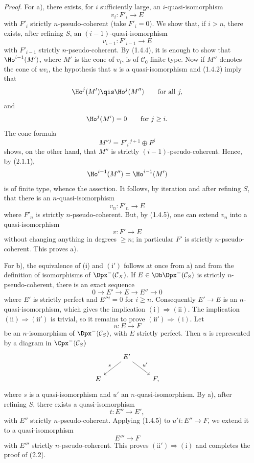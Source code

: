 \emph{Proof.} For a), there exists, for \(i\) sufficiently large, an \(i\)-quasi-isomorphism
\[
  v_i:F'_i\longrightarrow E
\]
with \(F'_i\) strictly \(n\)-pseudo-coherent (take \(F'_i=0\)). We show that, if \(i>n\), there exists, after refining \(S\), an \((i-1)\)-quasi-isomorphism
\[
  v_{i-1}:F'_{i-1}\longrightarrow E
\]
with \(F'_{i-1}\) strictly \(n\)-pseudo-coherent. By (1.4.4), it is enough to show that \(\Ho^{i-1}(M')\), where \(M'\) is the cone of \(v_i\), is of \(\mathcal C_0\)-finite type. Now if \(M''\) denotes the cone of \(uv_i\), the hypothesis that \(u\) is a quasi-isomorphism and (1.4.2) imply that
\[
  \Ho^j(M')\qis \Ho^j(M'')\qquad\text{for all }j,
\]
and
\[
  \Ho^j(M')=0\qquad\text{for }j\geq i.
\]
The cone formula
\[
  M''{}^j=F'_i{}^{\,j+1}\oplus F^j
\]
shows, on the other hand, that \(M''\) is strictly \((i-1)\)-pseudo-coherent. Hence, by (2.1.1),
\[
  \Ho^{i-1}(M'')=\Ho^{i-1}(M')
\]
is of finite type, whence the assertion. It follows, by iteration and after refining \(S\), that there is an \(n\)-quasi-isomorphism
\[
  v_n:F'_n\longrightarrow E
\]
where \(F'_n\) is strictly \(n\)-pseudo-coherent. But, by (1.4.5), one can extend \(v_n\) into a quasi-isomorphism
\[
  v:F'\longrightarrow E
\]
without changing anything in degrees \(\geq n\); in particular \(F'\) is strictly \(n\)-pseudo-coherent. This proves a).

For b), the equivalence of (i) and \((\mathrm{i}')\) follows at once from a) and from the definition of isomorphisms of \(\Dpx^-(\mathcal C_X)\). If \(E\in\Ob\Dpx^-(\mathcal C_S)\) is strictly \(n\)-pseudo-coherent, there is an exact sequence
\[
  0\longrightarrow E'\longrightarrow E\longrightarrow E''\longrightarrow 0
\]
where \(E'\) is strictly perfect and \(E''{}^i=0\) for \(i\geq n\). Consequently \(E'\to E\) is an \(n\)-quasi-isomorphism, which gives the implication \((\mathrm{i})\Rightarrow(\mathrm{ii})\). The implication \((\mathrm{ii})\Rightarrow(\mathrm{ii}')\) is trivial, so it remains to prove \((\mathrm{ii}')\Rightarrow(\mathrm{i})\). Let
\[
  u:E\longrightarrow F
\]
be an \(n\)-isomorphism of \(\Dpx^-(\mathcal C_S)\), with \(E\) strictly perfect. Then \(u\) is represented by a diagram in \(\Cpx^-(\mathcal C_S)\)
\[
\begin{tikzcd}
& E' \arrow[dl,"s"'] \arrow[dr,"u'"]\\
E && F ,
\end{tikzcd}
\]
where \(s\) is a quasi-isomorphism and \(u'\) an \(n\)-quasi-isomorphism. By a), after refining \(S\), there exists a quasi-isomorphism
\[
  t:E''\longrightarrow E',
\]
with \(E''\) strictly \(n\)-pseudo-coherent. Applying (1.4.5) to \(u't:E''\to F\), we extend it to a quasi-isomorphism
\[
  E'''\longrightarrow F
\]
with \(E'''\) strictly \(n\)-pseudo-coherent. This proves \((\mathrm{ii}')\Rightarrow(\mathrm{i})\) and completes the proof of (2.2).

